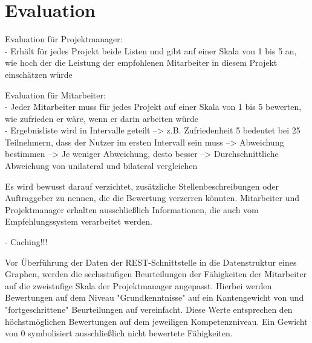 \newpage
\section{Evaluation}
\label{ch:methodik:evaluation}
Evaluation für Projektmanager:\\
- Erhält für jedes Projekt beide Listen und gibt auf einer Skala von 1 bis 5 an, wie hoch der die Leistung der empfohlenen Mitarbeiter in diesem Projekt einschätzen würde

Evaluation für Mitarbeiter:\\
- Jeder Mitarbeiter muss für jedes Projekt auf einer Skala von 1 bis 5 bewerten, wie zufrieden er wäre, wenn er darin arbeiten würde\\
- Ergebnisliste wird in Intervalle geteilt --> z.B. Zufriedenheit 5 bedeutet bei 25 Teilnehmern, dass der Nutzer im ersten Intervall sein muss --> Abweichung bestimmen --> Je weniger Abweichung, desto besser --> Durchschnittliche Abweichung von unilateral und bilateral vergleichen

Es wird bewusst darauf verzichtet, zusätzliche Stellenbeschreibungen oder Auftraggeber zu nennen, die die Bewertung verzerren könnten. Mitarbeiter und Projektmanager erhalten ausschließlich Informationen, die auch vom Empfehlungssystem verarbeitet werden.

- Caching!!!

Vor Überführung der Daten der REST-Schnittstelle in die Datenstruktur eines Graphen, werden die sechsstufigen Beurteilungen der Fähigkeiten der Mitarbeiter auf die zweistufige Skala der Projektmanager angepasst. Hierbei werden Bewertungen auf dem Niveau "Grundkenntnisse" auf ein Kantengewicht von \kantengewichtString und "fortgeschrittene" Beurteilungen auf \kantengewichtHochString vereinfacht. Diese Werte entsprechen den höchstmöglichen Bewertungen auf dem jeweiligen Kompetenzniveau. Ein Gewicht von 0 symbolisiert ausschließlich nicht bewertete Fähigkeiten.
